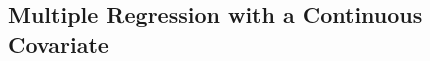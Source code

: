\documentclass[xcolor=svgnames,9pt,english,aspectratio=169,t]{beamer}
\begin{document}

\subsection{Multiple Regression with a Continuous Covariate}
\end{document}
